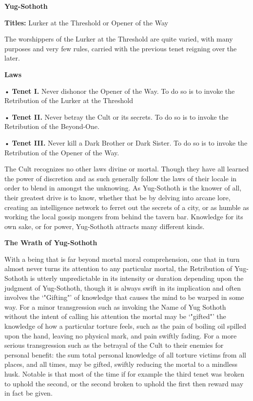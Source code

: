 \documentclass[blue]{guildcamp4}
\begin{document}
\name{\bYog{}}

\begin{center}{\bf Yug-Sothoth}\end{center}

{\bf Titles:} Lurker at the Threshold or Opener of the Way

The worshippers of the Lurker at the Threshold are quite varied, with many purposes and very few rules, carried with the previous tenet reigning over the later.

\begin{center}{\bf Laws}\end{center}

•	{\bf Tenet I.} Never dishonor the Opener of the Way. To do so is to invoke the Retribution of the Lurker at the Threshold   

•	{\bf Tenet II.} Never betray the Cult or its secrets. To do so is to invoke the Retribution of the Beyond-One. 

•	{\bf Tenet III.} Never kill a Dark Brother or Dark Sister. To do so is to invoke the Retribution of the Opener of the Way. 

The Cult recognizes no other laws divine or mortal. Though they have all learned the power of discretion and as such generally follow the laws of their locale in order to blend in amongst the unknowing. As Yug-Sothoth is the knower of all, their greatest drive is to know, whether that be by delving into arcane lore, creating an intelligence network to ferret out the secrets of a city, or as humble as working the local gossip mongers from behind the tavern bar. Knowledge for its own sake, or for power, Yug-Sothoth attracts many different kinds.

\begin{center}{\bf The Wrath of Yug-Sothoth}\end{center}

With a being that is far beyond mortal moral comprehension, one that in turn almost never turns its attention to any particular mortal, the Retribution of Yug-Sothoth is utterly unpredictable in its intensity or duration depending upon the judgment of Yug-Sothoth, though it is always swift in its implication and often involves the ‘"Gifting"’ of knowledge that causes the mind to be warped in some way. For a minor transgression such as invoking the Name of Yug Sothoth without the intent of calling his attention the mortal may be ‘"gifted"’ the knowledge of how a particular torture feels, such as the pain of boiling oil spilled upon the hand, leaving no physical mark, and pain swiftly fading. For a more serious transgression such as the betrayal of the Cult to their enemies for personal benefit: the sum total personal knowledge of all torture victims from all places, and all times, may be gifted, swiftly reducing the mortal to a mindless husk. Notable is that most of the time if for example the third tenet was broken to uphold the second, or the second broken to uphold the first then reward may in fact be given.
\end{document}
